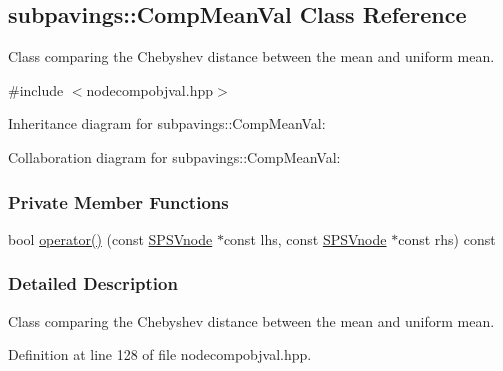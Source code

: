 \hypertarget{classsubpavings_1_1CompMeanVal}{\subsection{subpavings\-:\-:\-Comp\-Mean\-Val \-Class \-Reference}
\label{classsubpavings_1_1CompMeanVal}
}


\-Class comparing the \-Chebyshev distance between the mean and uniform mean.  




{\ttfamily \#include $<$nodecompobjval.\-hpp$>$}



\-Inheritance diagram for subpavings\-:\-:\-Comp\-Mean\-Val\-:


\-Collaboration diagram for subpavings\-:\-:\-Comp\-Mean\-Val\-:
\subsubsection*{\-Private \-Member \-Functions}
\begin{DoxyCompactItemize}
\item 
bool \hyperlink{classsubpavings_1_1CompMeanVal_aab54092fd695d46d9d1eb64af265ba0a}{operator()} (const \hyperlink{classsubpavings_1_1SPSVnode}{\-S\-P\-S\-Vnode} $\ast$const lhs, const \hyperlink{classsubpavings_1_1SPSVnode}{\-S\-P\-S\-Vnode} $\ast$const rhs) const 
\end{DoxyCompactItemize}


\subsubsection{\-Detailed \-Description}
\-Class comparing the \-Chebyshev distance between the mean and uniform mean. 

\-Definition at line 128 of file nodecompobjval.\-hpp.




